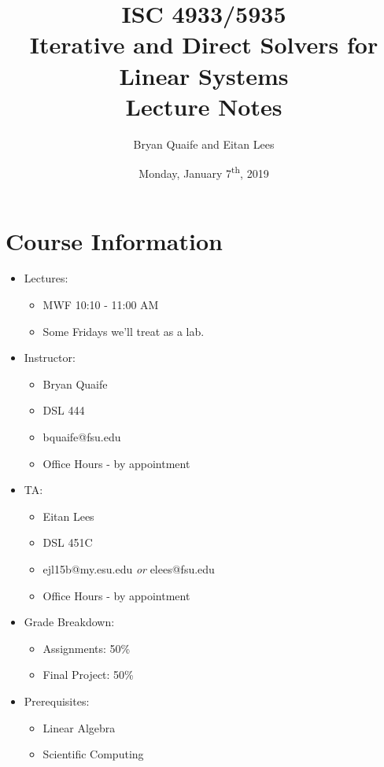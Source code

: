 \documentclass{article}
\title{ISC 4933/5935\\ 
Iterative and Direct Solvers for Linear Systems\\
Lecture Notes}
\author{Bryan Quaife and Eitan Lees}
\date{Monday, January 7\textsuperscript{th}, 2019}
\begin{document}
\maketitle

\section*{Course Information}

\begin{itemize}[label={}]
  \item Lectures:
    \begin{itemize}[label={}]
        \item MWF 10:10 - 11:00 AM
        \item Some Fridays we'll treat as a lab.
    \end{itemize}
    
  \item Instructor:
    \begin{itemize}[label={}]
        \item Bryan Quaife
        \item DSL 444
        \item bquaife@fsu.edu
        \item Office Hours - by appointment
    \end{itemize}
  
  \item TA:
    \begin{itemize}[label={}]
        \item Eitan Lees
        \item DSL 451C
        \item ejl15b@my.esu.edu \emph{or} elees@fsu.edu
        \item Office Hours - by appointment
    \end{itemize}
  
  \item Grade Breakdown:
    \begin{itemize}[label={}]
        \item Assignments: 50\%
        \item Final Project: 50\%
    \end{itemize}
    
  \item Prerequisites:
    \begin{itemize}[label={}]
        \item Linear Algebra
        \item Scientific Computing
    \end{itemize}
    

\end{itemize}
\end{document}
